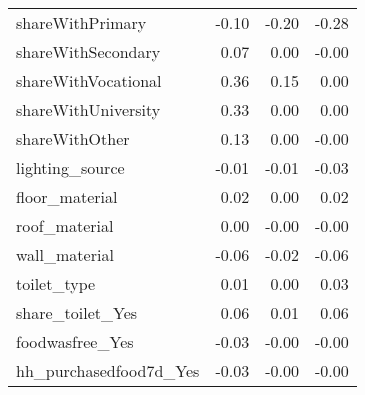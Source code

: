 \begin{longtable}{lrrr}
shareWithPrimary &              -0.10 &               -0.20 &                     -0.28 \\
shareWithSecondary &               0.07 &                0.00 &                     -0.00 \\
shareWithVocational &               0.36 &                0.15 &                      0.00 \\
shareWithUniversity &               0.33 &                0.00 &                      0.00 \\
shareWithOther &               0.13 &                0.00 &                     -0.00 \\
lighting\_source &              -0.01 &               -0.01 &                     -0.03 \\
floor\_material &               0.02 &                0.00 &                      0.02 \\
roof\_material &               0.00 &               -0.00 &                     -0.00 \\
wall\_material &              -0.06 &               -0.02 &                     -0.06 \\
toilet\_type &               0.01 &                0.00 &                      0.03 \\
share\_toilet\_Yes &               0.06 &                0.01 &                      0.06 \\
foodwasfree\_Yes &              -0.03 &               -0.00 &                     -0.00 \\
hh\_purchasedfood7d\_Yes &              -0.03 &               -0.00 &                     -0.00 \\

\end{longtable}